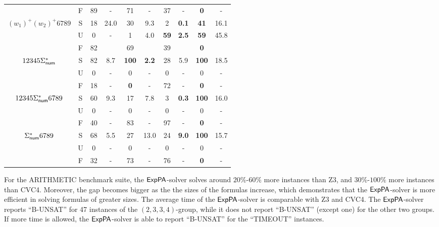 \begin{table*}[t]
{\begin{tabular}{cccccccccc}
         \cline{2-10}
        & F & 89 & - & 71 & - & 37 & - & {\bf 0} & - \\ 
        \cline{1-10}
       \multirow{3}{*}{\scriptsize{$(w_1)^+(w_2)^+6789$}} & S & 18 & 24.0 & 30 & 9.3 & 2 & {\bf  0.1} & {\bf 41} & 16.1 \\
      	 \cline{2-10}
        & U & 0 & - & 1 & 4.0 & {\bf 59} & {\bf 2.5} & {\bf 59} & 45.8 \\
         \cline{2-10}
        & F & 82 &  & 69 &  & 39 &  & {\bf 0} &  \\ \hline
        \cline{1-10}
       \multirow{3}{*}{\scriptsize{$12345\Sigma^*_{\sf num}$}} & S & 82 & 8.7 & {\bf 100} & {\bf 2.2} & 28 & 5.9 & {\bf 100} & 18.5 \\
        \cline{2-10}
        & U & 0 & - & 0 & - & 0 & - & 0 & - \\
         \cline{2-10}
        & F & 18 & - & {\bf 0} & - & 72 & - & {\bf 0} & - \\ 
        \cline{1-10}
       \multirow{3}{*}{\scriptsize{$12345\Sigma^*_{\sf num}6789$}} & S & 60 & 9.3 & 17 & 7.8 & 3 & {\bf 0.3} & {\bf 100} & 16.0 \\
        \cline{2-10}
        & U & 0 & - & 0 & - & 0 & - & 0 & - \\
         \cline{2-10}
        & F & 40 & - & 83 & - & 97 & - & {\bf 0} & - \\
        \cline{1-10}
       \multirow{3}{*}{\scriptsize{$\Sigma^*_{\sf num}6789$}} & S & 68 & 5.5 & 27 & 13.0 & 24 & {\bf 9.0} & {\bf 100} & 15.7 \\
        \cline{2-10}
        & U & 0 & - & 0 & - & 0 & - & 0 & - \\
         \cline{2-10}
        & F & 32 & - & 73 & - & 76 & - & {\bf 0} &- \\
        \hline
       \end{tabular}
    }
    \label{table:arithmetic}
\end{table*}


For the ARITHMETIC benchmark suite, the ${\sf ExpPA}$-solver solves around $20\%$-$60\%$ more instances than Z3, and $30\%$-$100\%$ more instances than CVC4. Moreover, the gap becomes bigger as the the sizes of the formulas increase, which demonstrates that the ${\sf ExpPA}$-solver is more efficient in solving formulas of greater sizes. The average time of the ${\sf ExpPA}$-solver is comparable with Z3 and CVC4. The ${\sf ExpPA}$-solver reports ``B-UNSAT'' for 47 instances of the $(2, 3, 3, 4)$-group, while it does not report ``B-UNSAT'' (except one) for the other two groups. If more time is allowed, the ${\sf ExpPA}$-solver is able to report ``B-UNSAT'' for the ``TIMEOUT'' instances. 

